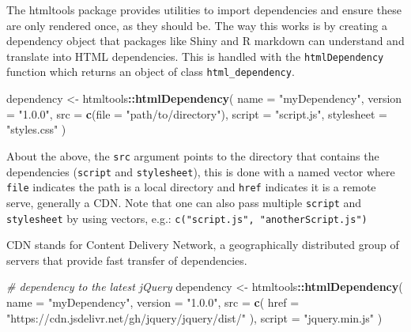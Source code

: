 \documentclass[
]{krantz}
\makeatletter
\newenvironment{Shaded}{\begin{snugshade}}{\end{snugshade}}
\newcommand{\CommentTok}[1]{\textcolor[rgb]{0.37,0.37,0.37}{\textit{#1}}}
\newcommand{\DataTypeTok}[1]{\textcolor[rgb]{0.27,0.27,0.27}{#1}}
\newcommand{\KeywordTok}[1]{\textcolor[rgb]{0.27,0.27,0.27}{\textbf{#1}}}
\newcommand{\NormalTok}[1]{#1}
\newcommand{\OperatorTok}[1]{\textcolor[rgb]{0.43,0.43,0.43}{\textbf{#1}}}
\newcommand{\StringTok}[1]{\textcolor[rgb]{0.5,0.5,0.5}{#1}}
\newenvironment{kframe}{%
\medskip{}
\setlength{\fboxsep}{.8em}
 \def\at@end@of@kframe{}%
 \ifinner\ifhmode%
  \def\at@end@of@kframe{\end{minipage}}%
  \begin{minipage}{\columnwidth}%
 \fi\fi%
 \def\FrameCommand##1{\hskip\@totalleftmargin \hskip-\fboxsep
 \colorbox{shadecolor}{##1}\hskip-\fboxsep
     \hskip-\linewidth \hskip-\@totalleftmargin \hskip\columnwidth}%
 \MakeFramed {\advance\hsize-\width
   \@totalleftmargin\z@ \linewidth\hsize
   \@setminipage}}%
 {\par\unskip\endMakeFramed%
 \at@end@of@kframe}
\renewenvironment{Shaded}{\begin{kframe}}{\end{kframe}}
\newenvironment{rmdblock}[1]
  {
  \begin{itemize}
  \renewcommand{\labelitemi}{
    \raisebox{-.7\height}[0pt][0pt]{
      {\setkeys{Gin}{width=3em,keepaspectratio}\texttt{[image: images/\#1]}}
    }
  }
  \setlength{\fboxsep}{1em}
  \begin{kframe}
  \item
  }
  {
  \end{kframe}
  \end{itemize}
  }
\newenvironment{rmdnote}
  {\begin{rmdblock}{note}}
  {\end{rmdblock}}
\makeatother
\begin{document}
The htmltools package provides utilities to import dependencies and ensure these are only rendered once, as they should be. The way this works is by creating a dependency object that packages like Shiny and R markdown can understand and translate into HTML dependencies. This is handled with the \texttt{htmlDependency} function which returns an object of class \texttt{html\_dependency}.

\begin{Shaded}
\begin{Highlighting}[]
\NormalTok{dependency <{-}}\StringTok{ }\NormalTok{htmltools}\OperatorTok{::}\KeywordTok{htmlDependency}\NormalTok{(}
  \DataTypeTok{name =} \StringTok{"myDependency"}\NormalTok{,}
  \DataTypeTok{version =} \StringTok{"1.0.0"}\NormalTok{,}
  \DataTypeTok{src =} \KeywordTok{c}\NormalTok{(}\DataTypeTok{file =} \StringTok{"path/to/directory"}\NormalTok{),}
  \DataTypeTok{script =} \StringTok{"script.js"}\NormalTok{,}
  \DataTypeTok{stylesheet =} \StringTok{"styles.css"}
\NormalTok{)}
\end{Highlighting}
\end{Shaded}

About the above, the \texttt{src} argument points to the directory that contains the dependencies (\texttt{script} and \texttt{stylesheet}), this is done with a named vector where \texttt{file} indicates the path is a local directory and \texttt{href} indicates it is a remote serve, generally a CDN. Note that one can also pass multiple \texttt{script} and \texttt{stylesheet} by using vectors, e.g.: \texttt{c("script.js",\ "anotherScript.js")}

\begin{rmdnote}
CDN stands for Content Delivery Network, a geographically distributed
group of servers that provide fast transfer of dependencies.
\end{rmdnote}

\begin{Shaded}
\begin{Highlighting}[]
\CommentTok{\# dependency to the latest jQuery}
\NormalTok{dependency <{-}}\StringTok{ }\NormalTok{htmltools}\OperatorTok{::}\KeywordTok{htmlDependency}\NormalTok{(}
  \DataTypeTok{name =} \StringTok{"myDependency"}\NormalTok{,}
  \DataTypeTok{version =} \StringTok{"1.0.0"}\NormalTok{,}
  \DataTypeTok{src =} \KeywordTok{c}\NormalTok{(}
    \DataTypeTok{href =} \StringTok{"https://cdn.jsdelivr.net/gh/jquery/jquery/dist/"}
\NormalTok{  ),}
  \DataTypeTok{script =} \StringTok{"jquery.min.js"}
\NormalTok{)}
\end{Highlighting}
\end{Shaded}
\end{document}
